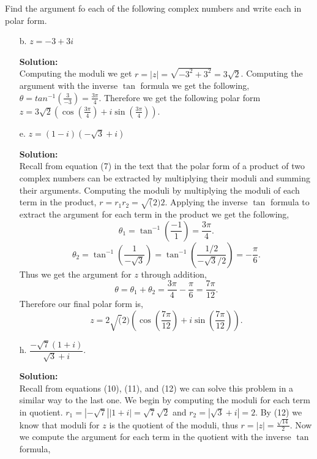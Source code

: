 \documentclass[12pt]{article}
\makeatletter
\theoremstyle{homework}
\newenvironment{exercise}[1]
{\def\@currentlabel{#1}\exercisecore}
{\endexercisecore}
\newcommand{\localhead}[1]{\par\smallskip\noindent\textbf{#1}\nobreak\\}%
\newcommand\solution{\localhead{Solution:}}
\makeatother
\begin{document}
\begin{exercise}{7} Find the argument fo each of the following complex numbers and write each in polar form. \\
    \begin{enumerate}
        \item[b.] $z = -3 + 3i$
        \solution Computing the moduli we get $r = |z| = \sqrt{-3^2 + 3^2} = 3\sqrt{2}$. Computing the argument with the 
        inverse $\tan$ formula we get the following, $\theta = tan^{-1}(\frac{3}{-3}) = \frac{3\pi}{4}$. Therefore we get the following 
        polar form $z = 3\sqrt{2}(\cos(\frac{3\pi}{4}) + i\sin(\frac{3\pi}{4}))$. 
        \item[e.] $z = (1 - i)(-\sqrt{3} + i)$
        \solution Recall from equation (7) in the text that the polar form of a product of two complex numbers can be extracted by multiplying their 
        moduli and summing their arguments. Computing the moduli by multiplying the moduli of each term in the product, $r = r_1r_2 = \sqrt(2)2$. Applying the inverse $\tan$ formula 
        to extract the argument for each term in the product we get the following, 
        \begin{equation*}
            \theta_1 = \tan^{-1}(\frac{-1}{1}) = \frac{3\pi}{4}.
        \end{equation*}
        \begin{equation*}
            \theta_2 = \tan^{-1}(\frac{1}{-\sqrt{3}}) = \tan^{-1}(\frac{1/2}{-\sqrt{3}/2}) = -\frac{\pi}{6}. 
        \end{equation*}
        Thus we get the argument for $z$ through addition, 
        \begin{equation*}
            \theta = \theta_1 + \theta_2 =  \frac{3\pi}{4}-\frac{\pi}{6} = \frac{7\pi}{12}.
        \end{equation*}
        Therefore our final polar form is, 
        \begin{equation*}
            z = 2\sqrt(2)(\cos( \frac{7\pi}{12}) + i\sin(\frac{7\pi}{12})).
        \end{equation*}
        \item[h.] $\dfrac{-\sqrt{7}(1 + i)}{\sqrt{3} + i}$. 
        \solution Recall from equations (10), (11), and (12) we can solve this problem in a similar way to the last one. We begin by computing the 
        moduli for each term in quotient. $r_1 = |-\sqrt{7}||1 + i| = \sqrt{7}\sqrt{2}$ and $r_2 = |\sqrt{3} + i| = 2$. By (12) we know that moduli for $z$ is the quotient of the 
        moduli, thus $r = |z| = \frac{\sqrt{14}}{2}$. Now we compute the argument for each term in the quotient with the inverse $\tan$ formula,

\end{enumerate}
\end{exercise}
\end{document}
